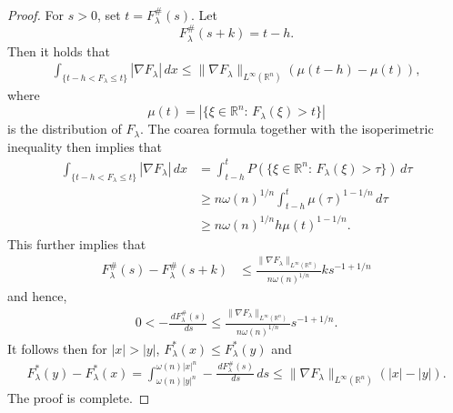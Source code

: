 \documentclass[11pt,twoside, leqno]{article}
\def\rr{{\mathbb R}}
\def\rn{{{\rr}^n}}
\numberwithin{equation}{section}
\begin{document}
\begin{proof}
For $s>0$, set $t=F_\lambda^\#(s)$. Let
$$F_\lambda^\#(s+k)=t-h.$$
Then it holds that
\begin{align*}
\int_{\{t-h<F_\lambda\le t\}} |\nabla F_\lambda|\,dx \le \|\nabla F_\lambda\|_{L^\infty(\rn)} \left(\mu(t-h)-\mu(t)\right),
\end{align*}
where
$$\mu(t)=|\{\xi\in\rn:\,F_\lambda(\xi)>t\}|$$
is the distribution of $F_\lambda$.
The coarea formula together with the isoperimetric inequality then implies that
\begin{align*}
\int_{\{t-h<F_\lambda\le t\}} |\nabla F_\lambda|\,dx &=\int_{t-h}^t P(\{\xi\in\rn:\,F_\lambda(\xi)>\tau\})\,d\tau\\
&\ge n\omega(n)^{1/n}  \int_{t-h}^t  \mu(\tau)^{1-1/n}\,d\tau\\
&\ge n\omega(n)^{1/n}h \mu(t)^{1-1/n}.
\end{align*}
This further implies that
\begin{align*}
F_\lambda^\#(s)-F_\lambda^\#(s+k)&\le \frac{\|\nabla F_\lambda\|_{L^\infty(\rn)}}{n\omega(n)^{1/n}} ks^{-1+1/n}
\end{align*}
and hence,
\begin{align*}
0<-\frac{\,dF_\lambda^\#(s)}{\,ds}\le \frac{\|\nabla F_\lambda\|_{L^\infty(\rn)}}{n\omega(n)^{1/n}} s^{-1+1/n}.
\end{align*}
It follows then for $|x|>|y|$, $F_\lambda^\ast(x)\le F_\lambda^\ast(y)$ and
\begin{align*}
F_\lambda^\ast(y)-F_\lambda^\ast(x)=\int_{\omega(n)|y|^n}^{\omega(n)|x|^n}-\frac{\,dF_\lambda^\#(s)}{\,ds}\,ds\le
\|\nabla F_\lambda\|_{L^\infty(\rn)}(|x|-|y|).
\end{align*}
The proof is complete.
\end{proof}
\end{document}
